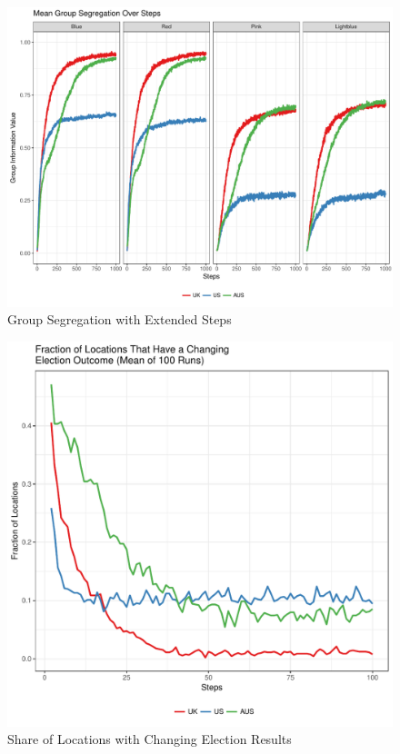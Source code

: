 \documentclass[12pt, a4paper]{article}
\begin{document}
	\begin{figure}[bp!]
		\centering
		\caption{Group Segregation with Extended Steps}
		\includegraphics[scale=0.6]{./Plots/grp_ratios_1000.pdf}
	\end{figure}

	\begin{figure}[bp!]
		\centering
		\caption{Share of Locations with Changing Election Results}
		\includegraphics[scale=0.6]{./Plots/election_plot.pdf}
	\end{figure}
	
\end{document}
